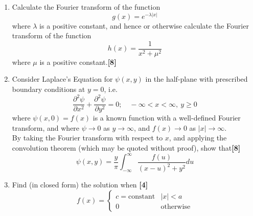 \documentclass[a4paper]{article}
\begin{document}
\begin{qns}\leavevmode
\begin{enumerate}[label=(\alph*)]
    \item Calculate the Fourier transform of the function
$$g(x)=e^{-\lambda|x|}$$
where $\lambda$ is a positive constant, and hence or otherwise calculate the Fourier transform of the function
$$h(x)=\frac{1}{x^2+\mu^2}$$
where $\mu$ is a positive constant.\hfill \textbf{[8]}
\item Consider Laplace's Equation for $\psi(x,y)$ in the half-plane with prescribed boundary conditions at $y=0$, i.e.
$$\frac{\partial^2\psi}{\partial x^2}+\frac{\partial^2\psi}{\partial y^2}=0;\quad -\infty<x<\infty,~y\geq0$$
where $\psi(x,0)=f(x)$ is a known function with a well-defined Fourier transform, and where $\psi\rightarrow0$ as $y\rightarrow\infty$, and $f(x)\rightarrow0$ as $|x|\rightarrow\infty$.\\[5pt]
By taking the Fourier transform with respect to $x$, and applying the convolution theorem (which may be quoted without proof), show that\hfill \textbf{[8]}
$$\psi(x,y)=\frac{y}{\pi}\int_{-\infty}^\infty\frac{f(u)}{(x-u)^2+y^2}du$$
\item Find (in closed form) the solution when \hfill \textbf{[4]}
$$f(x)=
\left\{
        \begin{array}{ll}
      c=\text{constant} & |x|<a \\
      0 & \text{otherwise}
        \end{array}
    \right.$$
\end{enumerate}
\end{qns}
\end{document}
